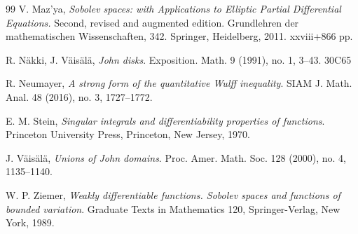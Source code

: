 \documentclass[reqno,11pt]{amsart}
\numberwithin{equation}{section}
\theoremstyle{remark}
\begin{document}
\begin{thebibliography}{99}
 V. Maz'ya, \emph{Sobolev spaces: with Applications to Elliptic Partial Differential Equations.} Second, revised and augmented edition. Grundlehren der mathematischen Wissenschaften, 342. Springer, Heidelberg, 2011.  xxviii+866 pp.



R. N\"akki,  J. V\"ais\"al\"a, 
 \emph{John disks}.
Exposition. Math. 9 (1991), no. 1, 3--43.
30C65

R. Neumayer, \emph{A strong form of the quantitative Wulff inequality}.  
SIAM J. Math. Anal. 48 (2016), no. 3, 1727--1772.

E. M. Stein,  \emph{Singular integrals and differentiability
properties of functions}.
Princeton University Press, Princeton, New Jersey, 1970.

%


%
 J. V\"ais\"al\"a, \emph{Unions of John domains}. Proc. Amer. Math. Soc. 128 (2000), no. 4, 1135--1140.

 W. P. Ziemer, \emph{Weakly differentiable  functions.  Sobolev    spaces    and   functions   of   bounded variation}.  Graduate Texts  in  Mathematics 120, Springer-Verlag, New York, 1989.

\end{thebibliography}
\end{document}
